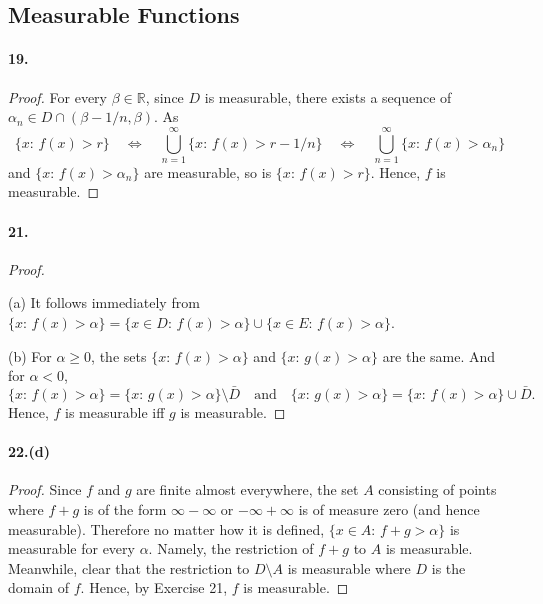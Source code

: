 
\setcounter{subsection}{4}
\subsection{Measurable Functions}
  \paragraph{19.}
  \begin{proof}
    For every $\beta\in\mathbb{R}$, since $D$ is measurable, there exists a 
    sequence of $\alpha_n\in D\cap(\beta-1/n,\beta)$. As
    \[
      \{x:\, f(x)>r\} \quad\Leftrightarrow\quad
      \bigcup_{n=1}^\infty \{x:\, f(x)>r-1/n\} \quad\Leftrightarrow\quad
      \bigcup_{n=1}^\infty \{x:\, f(x)>\alpha_n\}
    \]
    and $\{x:\, f(x)>\alpha_n\}$ are measurable, so is $\{x:\, f(x)>r\}$. Hence,
    $f$ is measurable.
  \end{proof}

  \paragraph{21.}
  \begin{proof}
    $\,$\par
    (a) It follows immediately from $\{x:\, f(x)>\alpha\} = \{x\in D:\, f(x)>
    \alpha\}\cup \{x\in E:\, f(x)>\alpha\}$.\par
    (b) For $\alpha\ge 0$, the sets $\{x:\, f(x)>\alpha\}$ and $\{x:\, g(x)>
    \alpha\}$ are the same. And for $\alpha < 0$, 
    \[
      \{x:\, f(x)>\alpha\} = \{x:\, g(x)>\alpha\} \setminus \bar{D}
      \quad\text{and}\quad
      \{x:\, g(x)>\alpha\} = \{x:\, f(x)>\alpha\} \cup \bar{D}.
    \]
    Hence, $f$ is measurable iff $g$ is measurable.
  \end{proof}

  \paragraph{22.(d)}
  \begin{proof}
    Since $f$ and $g$ are finite almost everywhere, the set $A$ consisting of 
    points where $f+g$ is of the form $\infty - \infty$ or $-\infty + \infty$ is
    of measure zero (and hence measurable). Therefore no matter how it is 
    defined, $\{x\in A:\,f+g>\alpha\}$ is measurable for every $\alpha$. Namely,
    the restriction of $f+g$ to $A$ is measurable. Meanwhile, clear that the 
    restriction to $D\setminus A$ is measurable where $D$ is the domain of $f$.
    Hence, by Exercise 21, $f$ is measurable.
  \end{proof}


